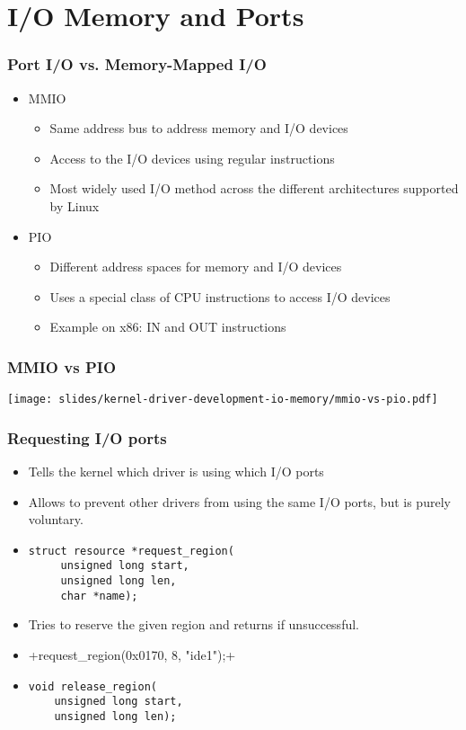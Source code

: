 \section{I/O Memory and Ports}

\begin{frame}
  \frametitle{Port I/O vs. Memory-Mapped I/O}
  \begin{itemize}
  \item MMIO
    \begin{itemize}
    \item Same address bus to address memory and I/O devices
    \item Access to the I/O devices using regular instructions
    \item Most widely used I/O method across the different
      architectures supported by Linux
    \end{itemize}
  \item PIO
    \begin{itemize}
    \item Different address spaces for memory and I/O devices
    \item Uses a special class of CPU instructions to access I/O
      devices
    \item Example on x86: IN and OUT instructions
    \end{itemize}
  \end{itemize}
\end{frame}

\begin{frame}
  \frametitle{MMIO vs PIO}
  \begin{center}
    \texttt{[image: slides/kernel-driver-development-io-memory/mmio-vs-pio.pdf]}
  \end{center}
\end{frame}

\begin{frame}[fragile]
  \frametitle{Requesting I/O ports}
  \begin{itemize}
  \item Tells the kernel which driver is using which I/O ports
  \item Allows to prevent other drivers from using the same I/O ports,
    but is purely voluntary.
  \item
\begin{verbatim}
struct resource *request_region(
     unsigned long start,
     unsigned long len,
     char *name);
\end{verbatim}
  \item Tries to reserve the given region and returns  if unsuccessful.
  \item {}+request_region(0x0170, 8, "ide1");+
  \item
\begin{verbatim}
void release_region(
    unsigned long start,
    unsigned long len);
\end{verbatim}
\end{itemize}
\end{frame}

